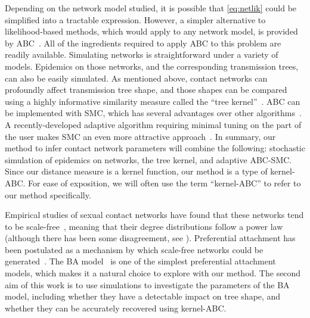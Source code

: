 Depending on the network model studied, it is possible that \cref{eq:netlik}
could be simplified into a tractable expression. However, a simpler alternative
to likelihood-based methods, which would apply to any network model, is
provided by
\gls{ABC}~\autocite{rubin1984bayesianly,tavare1997inferring,fu1997estimating,beaumont2002approximate}.
All of the ingredients required to apply \gls{ABC} to this problem are readily
available. Simulating networks is straightforward under a variety of models.
Epidemics on those networks, and the corresponding transmission trees, can also
be easily simulated. As mentioned above, contact networks can profoundly affect
transmission tree shape, and those shapes can be compared using a highly
informative similarity measure called the ``tree
kernel''~\autocite{poon2013mapping}. \Gls{ABC} can be implemented with
\gls{SMC}, which has several advantages over other
algorithms~\autocite{mckinley2009inference}. A recently-developed adaptive
algorithm requiring minimal tuning on the part of the user makes \gls{SMC} an
even more attractive approach~\autocite{del2012adaptive}. In summary, our
method to infer contact network parameters will combine the following:
stochastic simulation of epidemics on networks, the tree kernel, and adaptive
\gls{ABC}-\gls{SMC}. Since our distance measure is a kernel function, our
method is a type of kernel-\gls{ABC}. For ease of exposition, we will often use
the term ``kernel-\gls{ABC}'' to refer to our method specifically.

Empirical studies of sexual contact networks have found that these networks
tend to be scale-free~\autocite{colgate1989risk, liljeros2001web,
schneeberger2004scale, clemencon2015statistical}, meaning that their degree
distributions follow a power law (although there has been some disagreement,
see \autocite{handcock2004likelihood, bansal2007individual}). Preferential
attachment has been postulated as a mechanism by which scale-free networks
could be generated~\autocite{barabasi1999emergence}. The \gls{BA}
model~\autocite{barabasi1999emergence} is one of the simplest preferential
attachment models, which makes it a natural choice to explore with our method.
The second aim of this work is to use simulations to investigate the parameters
of the \gls{BA} model, including whether they have a detectable impact on tree
shape, and whether they can be accurately recovered using kernel-\gls{ABC}.

